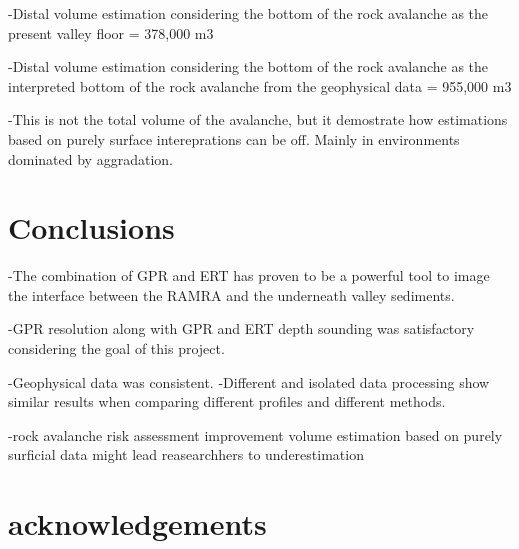 \documentclass[5p]{elsarticle}
\begin{document}
-Distal volume estimation considering the bottom of the rock avalanche as the present valley floor =  378,000 m3

-Distal volume estimation considering the bottom of the rock avalanche as the interpreted bottom of the rock avalanche from the geophysical data = 955,000 m3 

-This is not the total volume of the avalanche, but it demostrate how estimations based on purely surface intereprations can be off. Mainly in environments dominated by aggradation. 





\section{Conclusions}

-The combination of GPR and ERT has proven to be a powerful tool to image the interface between the RAMRA and the underneath valley sediments. 


-GPR resolution along with GPR and ERT depth sounding was satisfactory considering the goal of this project. 

-Geophysical data was consistent.
	-Different and isolated data processing show similar results when comparing different profiles and different methods. 


-rock avalanche risk assessment improvement 
	volume estimation based on purely surficial data might lead reasearchhers to underestimation


\section{acknowledgements}







\end{document}
